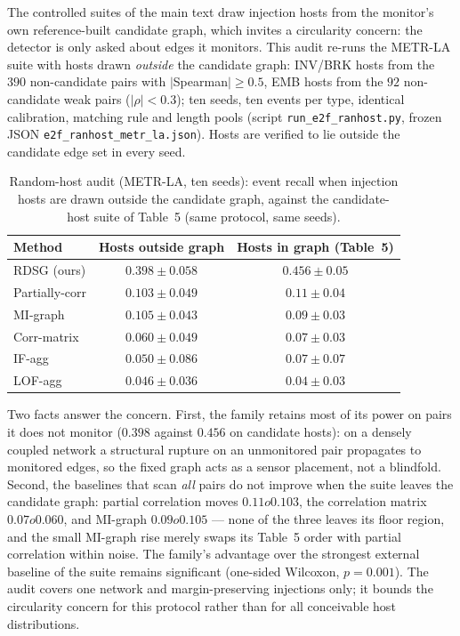 \documentclass[11pt,a4paper]{article}
\begin{document}
The controlled suites of the main text draw injection hosts from the
monitor's own reference-built candidate graph, which invites a
circularity concern: the detector is only asked about edges it monitors.
This audit re-runs the METR-LA suite with hosts drawn \emph{outside} the
candidate graph: INV/BRK hosts from the $390$ non-candidate pairs with
$|$Spearman$|\ge 0.5$, EMB hosts from the $92$ non-candidate weak pairs
($|\rho|<0.3$); ten seeds, ten events per type, identical calibration,
matching rule and length pools (script \texttt{run\_e2f\_ranhost.py},
frozen JSON \texttt{e2f\_ranhost\_metr\_la.json}). Hosts are verified to
lie outside the candidate edge set in every seed.

\begin{table}[h]\centering\small
\caption{Random-host audit (METR-LA, ten seeds): event recall when
injection hosts are drawn outside the candidate graph, against the
candidate-host suite of Table~5 (same protocol, same seeds).}
\label{tab:s19}
\begin{tabular}{lcc}
\hline
Method & Hosts outside graph & Hosts in graph (Table~5) \\
\hline
RDSG (ours) & $0.398\pm0.058$ & $0.456\pm0.05$ \\
Partially-corr & $0.103\pm0.049$ & $0.11\pm0.04$ \\
MI-graph & $0.105\pm0.043$ & $0.09\pm0.03$ \\
Corr-matrix & $0.060\pm0.049$ & $0.07\pm0.03$ \\
IF-agg & $0.050\pm0.086$ & $0.07\pm0.07$ \\
LOF-agg & $0.046\pm0.036$ & $0.04\pm0.03$ \\
\hline
\end{tabular}
\end{table}

Two facts answer the concern. First, the family retains most of its
power on pairs it does not monitor ($0.398$ against $0.456$ on
candidate hosts): on a densely coupled network a structural rupture on
an unmonitored pair propagates to monitored edges, so the fixed graph
acts as a sensor placement, not a blindfold. Second, the baselines that
scan \emph{all} pairs do not improve when the suite leaves the candidate
graph: partial correlation moves $0.11	o0.103$, the correlation
matrix $0.07	o0.060$, and MI-graph $0.09	o0.105$ --- none of the
three leaves its floor region, and the small MI-graph rise merely swaps
its Table~5 order with partial correlation within noise. The family's
advantage over the strongest external baseline of the suite remains
significant (one-sided Wilcoxon, $p=0.001$). The audit covers one
network and margin-preserving injections only; it bounds the
circularity concern for this protocol rather than for all conceivable
host distributions.
\end{document}
